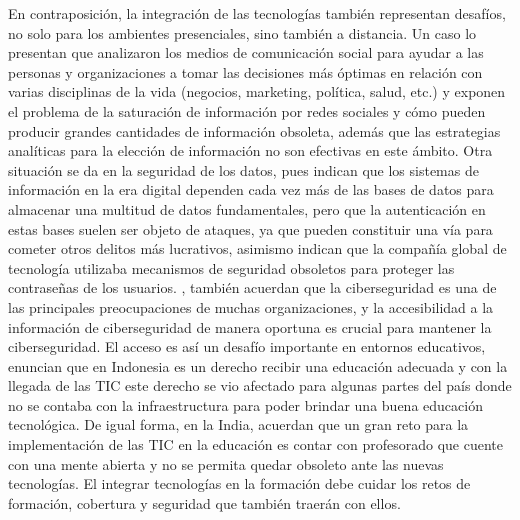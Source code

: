 \documentclass[spanish]{textolivre}
\begin{document}
En contraposición, la integración de las tecnologías también representan desafíos, no solo para los ambientes presenciales, sino también a distancia. Un caso lo presentan \textcite{sebei_review_2018} que analizaron los medios de comunicación social para ayudar a las personas y organizaciones a tomar las decisiones más óptimas en relación con varias disciplinas de la vida (negocios, marketing, política, salud, etc.) y exponen el problema de la saturación de información por redes sociales y cómo pueden producir grandes cantidades de información obsoleta, además que las estrategias analíticas para la elección de información no son efectivas en este ámbito. Otra situación se da en la seguridad de los datos, pues \textcite{blue_novel_2017} indican que  los sistemas de información en la era digital dependen cada vez más de las bases de datos para almacenar una multitud de datos fundamentales, pero que la autenticación en estas bases suelen ser objeto de ataques, ya que pueden constituir una vía para cometer otros delitos más lucrativos, asimismo indican que la compañía global de tecnología utilizaba mecanismos de seguridad obsoletos para proteger las contraseñas de los usuarios. \textcite{takahashi_web_2018}, también acuerdan que la ciberseguridad es una de las principales preocupaciones de muchas organizaciones, y la accesibilidad a la información de ciberseguridad de manera oportuna es crucial para mantener la ciberseguridad. El acceso es así un desafío importante en entornos educativos, \textcite{roslina_role_2017} enuncian que en Indonesia es un derecho recibir una educación adecuada y con la llegada de las TIC este derecho se vio afectado para algunas partes del país donde no se contaba con la infraestructura para poder brindar una buena educación tecnológica. De igual forma, \textcite{thankachan_challenges_2017} en la India, acuerdan que un gran reto para la implementación de las TIC en la educación es contar con profesorado que cuente con una mente abierta y no se permita quedar obsoleto ante las nuevas tecnologías. El integrar tecnologías en la formación debe cuidar los retos de formación, cobertura y seguridad que también traerán con ellos.
\end{document}

